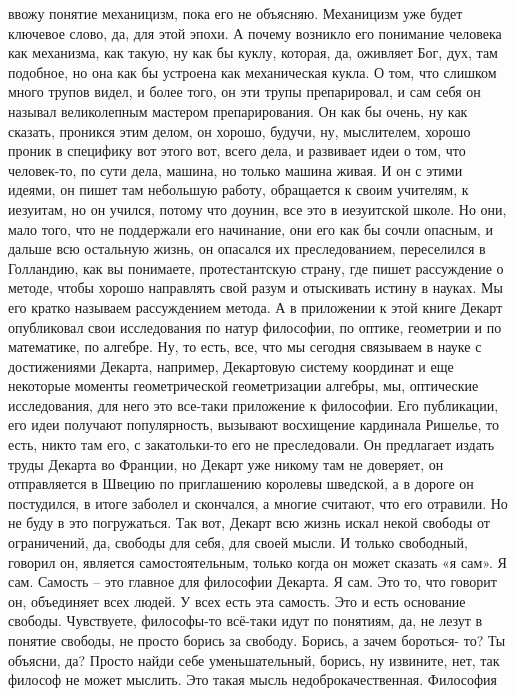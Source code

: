 ввожу понятие механицизм, пока его не объясняю. Механицизм уже будет ключевое
слово, да, для этой эпохи. А почему возникло его понимание человека как
механизма, как такую, ну как бы куклу, которая, да, оживляет Бог, дух, там
подобное, но она как бы устроена как механическая кукла. О том, что слишком
много трупов видел, и более того, он эти трупы препарировал, и сам себя он
называл великолепным мастером препарирования. Он как бы очень, ну как сказать,
проникся этим делом, он хорошо, будучи, ну, мыслителем, хорошо проник в
специфику вот этого вот, всего дела, и развивает идеи о том, что человек-то, по
сути дела, машина, но только машина живая. И он с этими идеями, он пишет там
небольшую работу, обращается к своим учителям, к иезуитам, но он учился, потому
что доунин, все это в иезуитской школе. Но они, мало того, что не поддержали его
начинание, они его как бы сочли опасным, и дальше всю остальную жизнь, он
опасался их преследованием, переселился в Голландию, как вы понимаете,
протестантскую страну, где пишет рассуждение о методе, чтобы хорошо направлять
свой разум и отыскивать истину в науках. Мы его кратко называем рассуждением
метода. А в приложении к этой книге Декарт опубликовал свои исследования по
натур философии, по оптике, геометрии и по математике, по алгебре. Ну, то есть,
все, что мы сегодня связываем в науке с достижениями Декарта, например,
Декартовую систему координат и еще некоторые моменты геометрической
геометризации алгебры, мы, оптические исследования, для него это все-таки
приложение к философии. Его публикации, его идеи получают популярность, вызывают
восхищение кардинала Ришелье, то есть, никто там его, с закатольки-то его не
преследовали. Он предлагает издать труды Декарта во Франции, но Декарт уже
никому там не доверяет, он отправляется в Швецию по приглашению королевы
шведской, а в дороге он постудился, в итоге заболел и скончался, а многие
считают, что его отравили. Но не буду в это погружаться. Так вот, Декарт всю
жизнь искал некой свободы от ограничений, да, свободы для себя, для своей мысли.
И только свободный, говорил он, является самостоятельным, только когда он может
сказать «я сам». Я сам. Самость – это главное для философии Декарта. Я сам. Это
то, что говорит он, объединяет всех людей. У всех есть эта самость. Это и есть
основание свободы. Чувствуете, философы-то всё-таки идут по понятиям, да, не
лезут в понятие свободы, не просто борись за свободу. Борись, а зачем бороться-
то? Ты объясни, да? Просто найди себе уменьшательный, борись, ну извините, нет,
так философ не может мыслить. Это такая мысль недоброкачественная. Философия
